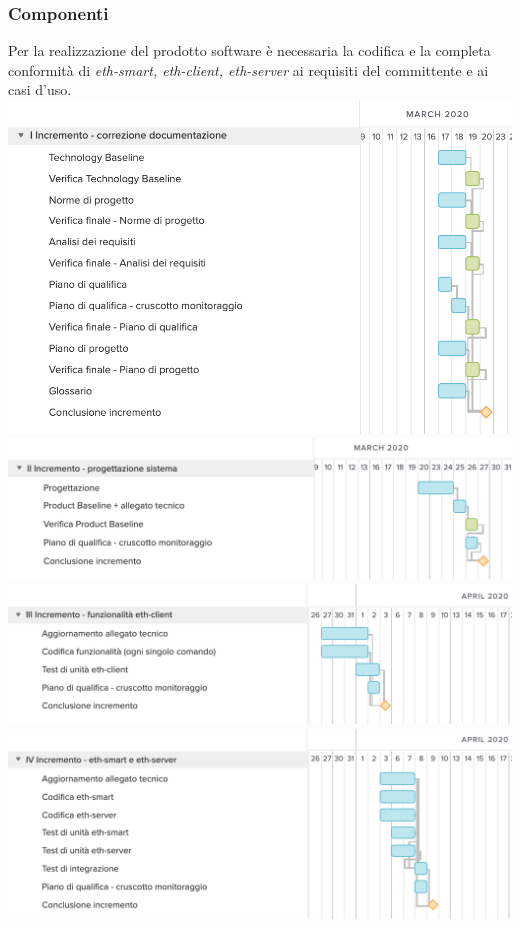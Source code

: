 \subsubsection{Componenti}
Per la realizzazione del prodotto software è necessaria la codifica e la completa conformità di \textit{eth-smart, eth-client, eth-server} ai requisiti del committente e ai casi d'uso.
	\includegraphics[width=\textwidth]{res/img/gantt/RQ/1}
	\includegraphics[width=\textwidth]{res/img/gantt/RQ/2}
	\includegraphics[width=\textwidth]{res/img/gantt/RQ/3}
	\includegraphics[width=\textwidth]{res/img/gantt/RQ/4}
